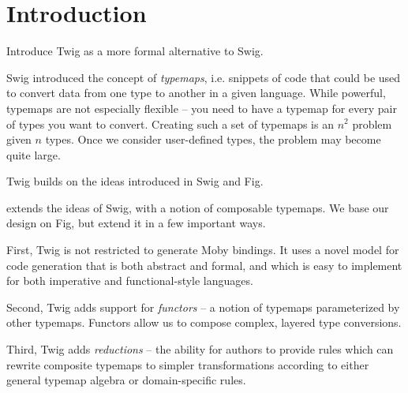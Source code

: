 
\section{Introduction}

Introduce Twig as a more formal alternative to Swig.

Swig introduced the concept of \emph{typemaps}, i.e. snippets of code that could
be used to convert data from one type to another in a given language. While
powerful, typemaps are not especially flexible -- you need to have a typemap for
every pair of types you want to convert. Creating such a set of typemaps is an
$n^2$ problem given $n$ types. Once we consider user-defined types, the problem
may become quite large.

Twig builds on the ideas introduced in Swig and Fig.

extends the ideas of Swig, with a notion of composable typemaps. We base
our design on Fig, but extend it in a few important ways.

First, Twig is not restricted to generate Moby bindings. It uses a novel model
for code generation that is both abstract and formal, and which is easy to
implement for both imperative and functional-style languages.

Second, Twig adds support for \emph{functors} -- a notion of typemaps
parameterized by other typemaps. Functors allow us to compose complex, layered
type conversions.

Third, Twig adds \emph{reductions} -- the ability for authors to provide rules
which can rewrite composite typemaps to simpler transformations according to
either general typemap algebra or domain-specific rules.
